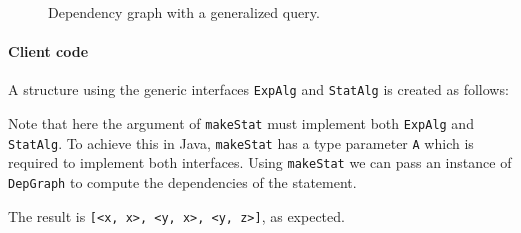 \begin{figure}[t]
\nocaptionrule
\caption{Dependency graph with a generalized query.}
\label{deps2}
\end{figure}

\paragraph{Client code} A structure using the generic interfaces
\lstinline{ExpAlg} and \lstinline{StatAlg} is created as follows:


\noindent Note that here the argument of
\lstinline{makeStat} must
implement both \lstinline{ExpAlg} and \lstinline{StatAlg}. To achieve
this in Java, \lstinline{makeStat} has a type parameter \lstinline{A}
which is required to implement both interfaces. Using
\lstinline{makeStat} we can pass an instance of
\lstinline{DepGraph} to compute the dependencies of the statement.


The result is \lstinline{[<x, x>, <y, x>, <y, z>]}, as expected.


